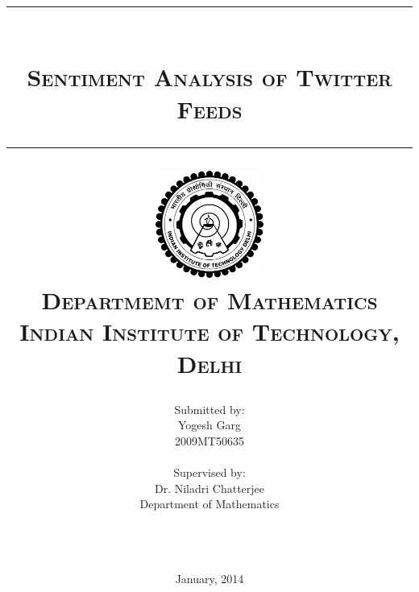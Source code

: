 \title{
	\rule{0.9\textwidth}{.4pt}\\ \vspace{10pt}
	\textsc{
		Sentiment Analysis of Twitter Feeds
	}\\
	\rule{0.9\textwidth}{.4pt}
\vfill
	\includegraphics[height=100pt]{img/iitd_logo.png}\\
\vspace{10pt}
	\textsc{\Large{
		Departmemt of Mathematics\\
		Indian Institute of Technology, Delhi
	}}
\vspace{100pt}
}

\author{
\begin{minipage}{0.5\textwidth}\centering
	\small{Submitted by:}\\
	Yogesh Garg\\
	\small{2009MT50635}\\
\end{minipage}\begin{minipage}{0.5\textwidth}\centering
	\small{Supervised by:}\\
	Dr. Niladri Chatterjee\\
	\small{Department of Mathematics}\\
\end{minipage}\\
	\rule{0.9\textwidth}{.4pt}
}

\date{January, 2014}

\clearpage\maketitle
\thispagestyle{empty}
\setcounter{page}{0}